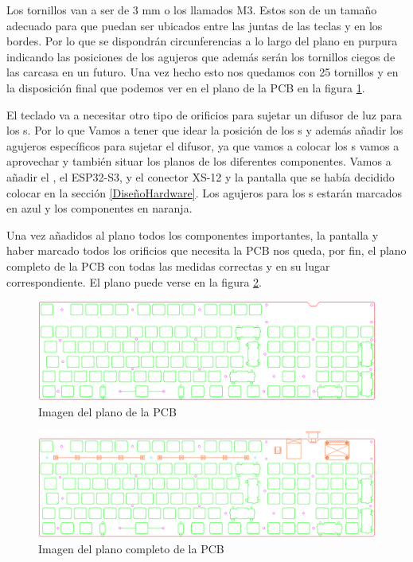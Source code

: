 Los tornillos van a ser de 3 mm o los llamados M3. Estos son de un tamaño adecuado para que puedan ser ubicados entre las juntas de las teclas y en los bordes. Por lo que se dispondrán circunferencias a lo largo del plano en purpura indicando las posiciones de los agujeros que además serán los tornillos ciegos de las carcasa en un futuro. Una vez hecho esto nos quedamos con 25 tornillos y en la disposición final que podemos ver en el plano de la \gls{PCB} en la figura \ref{fig:PlanoPCB}.

El teclado va a necesitar otro tipo de orificios para sujetar un difusor de luz para los s. Por lo que Vamos a tener que idear la posición de los s y además añadir los agujeros específicos para sujetar el difusor, ya que vamos a colocar los s vamos a aprovechar y también situar los planos de los diferentes componentes. Vamos a añadir el , el ESP32-S3, y el conector XS-12 y la pantalla que se había decidido colocar en la sección \ref{DiseñoHardware}. Los agujeros para los s estarán marcados en azul y los componentes en naranja.

Una vez añadidos al plano todos los componentes importantes, la pantalla y haber marcado todos los orificios que necesita la \gls{PCB} nos queda, por fin, el plano completo de la \gls{PCB} con todas las medidas correctas y en su lugar correspondiente. El plano puede verse en la figura \ref{fig:PlanoPCBConTodo}.

\begin{figure}[H]
    \centering
    \includegraphics[width=1\textwidth]{imagenes/Capitulos/Cap05/PlanoPCB.png}
    \caption{Imagen del plano de la \gls{PCB} \cite{Repo:Planos}}
    \label{fig:PlanoPCB}
\end{figure}

\begin{figure}[H]
    \centering
    \includegraphics[width=1\textwidth]{imagenes/Capitulos/Cap05/PlanoConPartes.png}
    \caption{Imagen del plano completo de la \gls{PCB} \cite{Repo:Planos}}
    \label{fig:PlanoPCBConTodo}
\end{figure}

